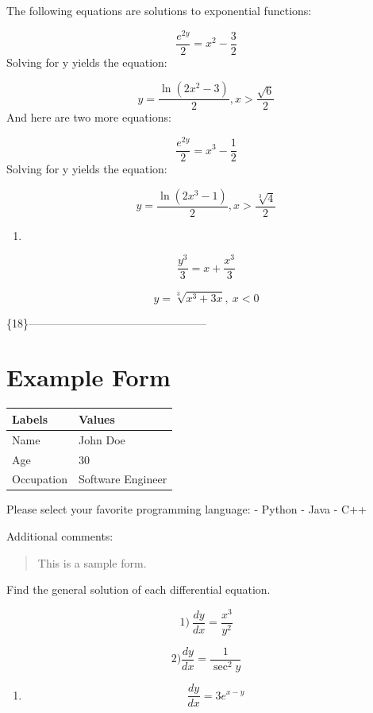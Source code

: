\documentclass[
]{article}
\providecommand{\tightlist}{%
  \setlength{\itemsep}{0pt}\setlength{\parskip}{0pt}}
\begin{document}
The following equations are solutions to exponential functions:

\[\frac{e^{2y}}{2} = x^2 - \frac{3}{2}\] Solving for y yields the
equation:

\[y = \frac{\ln(2x^2 - 3)}{2}, x > \frac{\sqrt{6}}{2}\] And here are two
more equations:

\[\frac{e^{2y}}{2} = x^3 - \frac{1}{2}\] Solving for y yields the
equation:

\[y = \frac{\ln(2x^3 - 1)}{2}, x > \frac{\sqrt[3]{4}}{2}\]

\begin{enumerate}
\def\labelenumi{\arabic{enumi})}
\setcounter{enumi}{11}
\tightlist
\item
\end{enumerate}

\[\frac{y^3}{3} = x + \frac{x^3}{3}\]

\[y = \sqrt[3]{x^3 + 3x},~x < 0\]

\{18\}------------------------------------------------

\section{Example Form}\label{example-form}

\begin{longtable}[]{@{}ll@{}}
\toprule\noalign{}
Labels & Values \\
\midrule\noalign{}
\endhead
\bottomrule\noalign{}
\endlastfoot
Name & John Doe \\
Age & 30 \\
Occupation & Software Engineer \\
\end{longtable}

Please select your favorite programming language: - Python - Java - C++

Additional comments:

\begin{quote}
This is a sample form.
\end{quote}

Find the general solution of each differential equation.

\[1) \ \frac{dy}{dx} = \frac{x^3}{y^2}\]

\[2) \frac{dy}{dx} = \frac{1}{\sec^2 y}\]

\begin{enumerate}
\def\labelenumi{\arabic{enumi})}
\setcounter{enumi}{2}
\tightlist
\item
  \[\frac{dy}{dx} = 3e^{x-y}\]
\end{enumerate}
\end{document}
